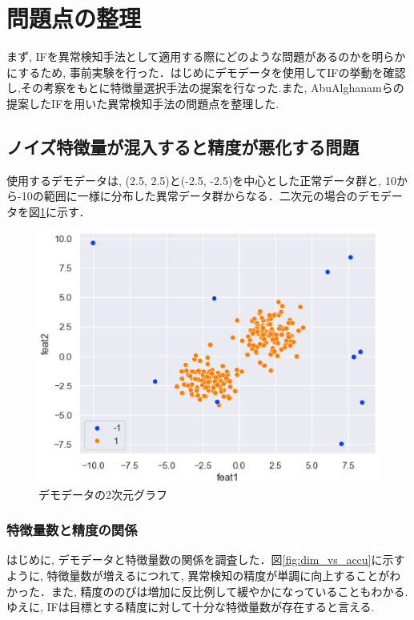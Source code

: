 \documentclass{css}
\begin{document}
\section{問題点の整理}
まず, IFを異常検知手法として適用する際にどのような問題があるのかを明らかにするため, 事前実験を行った．はじめにデモデータを使用してIFの挙動を確認し,その考察をもとに特徴量選択手法の提案を行なった.また, AbuAlghanamらの提案したIFを用いた異常検知手法\cite{AbuAlghanam2023-sx}の問題点を整理した. 

\subsection{ノイズ特徴量が混入すると精度が悪化する問題}
使用するデモデータは, (2.5, 2.5)と(-2.5, -2.5)を中心とした正常データ群と, 10から-10の範囲に一様に分布した異常データ群からなる．二次元の場合のデモデータを図\ref{fig:demodata}に示す．

\begin{figure}[ht]
    \centering
    \includegraphics[width=0.9\linewidth]{pictures/eps/demodata.eps}
    \caption{デモデータの2次元グラフ}
    \label{fig:demodata}
\end{figure}

\subsubsection{特徴量数と精度の関係}
はじめに, デモデータと特徴量数の関係を調査した．図\ref{fig:dim_vs_accu}に示すように, 特徴量数が増えるにつれて, 異常検知の精度が単調に向上することがわかった．また, 精度ののびは増加に反比例して緩やかになっていることもわかる. ゆえに, IFは目標とする精度に対して十分な特徴量数が存在すると言える. 
\end{document}
